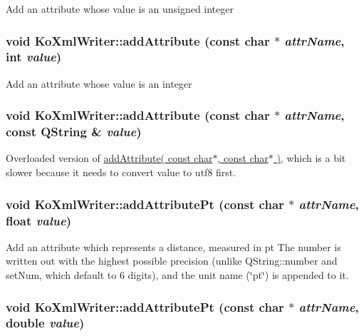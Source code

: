 \label{classKoXmlWriter_ae3103a2a23b5a037272ccae9a378d5d2}
Add an attribute whose value is an unsigned integer \hypertarget{classKoXmlWriter_afa11b5f1fed349624106280436ca7fb5}{
\subsubsection[{addAttribute}]{\setlength{\rightskip}{0pt plus 5cm}void KoXmlWriter::addAttribute (const char $\ast$ {\em attrName}, \/  int {\em value})}}
\label{classKoXmlWriter_afa11b5f1fed349624106280436ca7fb5}
Add an attribute whose value is an integer \hypertarget{classKoXmlWriter_adbe177678ee94042b4fd352245e625c6}{
\subsubsection[{addAttribute}]{\setlength{\rightskip}{0pt plus 5cm}void KoXmlWriter::addAttribute (const char $\ast$ {\em attrName}, \/  const QString \& {\em value})}}
\label{classKoXmlWriter_adbe177678ee94042b4fd352245e625c6}
Overloaded version of \hyperlink{classKoXmlWriter_a920571457da436ac3c6e7f8f0521e48c}{addAttribute( const char$\ast$, const char$\ast$ )}, which is a bit slower because it needs to convert {\ttfamily value} to utf8 first. \hypertarget{classKoXmlWriter_a09a850bdbc2da6652e370508d03c6395}{
\subsubsection[{addAttributePt}]{\setlength{\rightskip}{0pt plus 5cm}void KoXmlWriter::addAttributePt (const char $\ast$ {\em attrName}, \/  float {\em value})}}
\label{classKoXmlWriter_a09a850bdbc2da6652e370508d03c6395}
Add an attribute which represents a distance, measured in pt The number is written out with the highest possible precision (unlike QString::number and setNum, which default to 6 digits), and the unit name (\char`\"{}pt\char`\"{}) is appended to it. \hypertarget{classKoXmlWriter_a59281d5370c489c60515726e0b38ccd0}{
\subsubsection[{addAttributePt}]{\setlength{\rightskip}{0pt plus 5cm}void KoXmlWriter::addAttributePt (const char $\ast$ {\em attrName}, \/  double {\em value})}}
